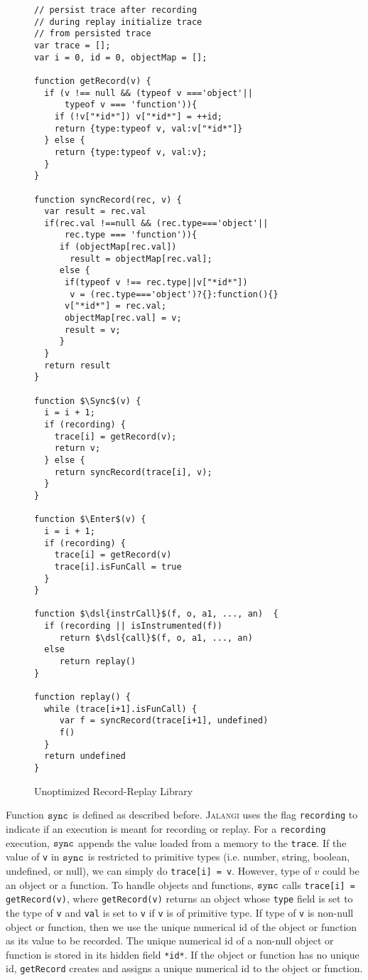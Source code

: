 \documentclass{sig-alternate}
\def\jalangi{\textsc{Jalangi}}
\newcommand \dsl [1] {\ensuremath{{\tt #1}}\xspace}
\newcommand \Sync{\dsl{sync}}
\newcommand \Enter{\dsl{enter}}
\begin{document}
\lstset{language=JavaScript}
\begin{figure}
 {\scriptsize 
\begin{lstlisting}[mathescape]
// persist trace after recording
// during replay initialize trace 
// from persisted trace 
var trace = []; 
var i = 0, id = 0, objectMap = [];

function getRecord(v) {
  if (v !== null && (typeof v ==='object'||  
      typeof v === 'function')){
    if (!v["*id*"]) v["*id*"] = ++id;
    return {type:typeof v, val:v["*id*"]}
  } else {
    return {type:typeof v, val:v};
  }
}

function syncRecord(rec, v) {
  var result = rec.val
  if(rec.val !==null && (rec.type==='object'|| 
      rec.type === 'function')){
     if (objectMap[rec.val])
       result = objectMap[rec.val];
     else {
      if(typeof v !== rec.type||v["*id*"]) 
       v = (rec.type==='object')?{}:function(){}
      v["*id*"] = rec.val;
      objectMap[rec.val] = v;
      result = v;
     }
  }
  return result
}

function $\Sync$(v) {
  i = i + 1;
  if (recording) {
    trace[i] = getRecord(v);
    return v;
  } else {
    return syncRecord(trace[i], v);
  }
}

function $\Enter$(v) {
  i = i + 1;
  if (recording) {
    trace[i] = getRecord(v)
    trace[i].isFunCall = true
  }
}

function $\dsl{instrCall}$(f, o, a1, ..., an)  {
  if (recording || isInstrumented(f)) 
     return $\dsl{call}$(f, o, a1, ..., an)
  else
     return replay()
}

function replay() {
  while (trace[i+1].isFunCall) {
     var f = syncRecord(trace[i+1], undefined)
     f()
  }
  return undefined
}
\end{lstlisting}
}
  \caption{Unoptimized Record-Replay Library}
  \label{fig:lib1}
\end{figure}

Function $\Sync$ is defined as described before.  \jalangi{} uses the
flag \texttt{recording} to indicate if an execution is meant for
recording or replay.  For a \texttt{recording} execution, $\Sync$
appends the value loaded from a memory to the \texttt{trace}.  If the
value of \texttt{v} in $\Sync$ is restricted to primitive types
(i.e. number, string, boolean, undefined, or null), we can simply do
\texttt{trace[i] = v}.  However, type of $v$ could be an object or a
function.  To handle objects and functions, $\Sync$ calls
\texttt{trace[i] = getRecord(v)}, where \texttt{getRecord(v)} returns
an object whose \texttt{type} field is set to the type of \texttt{v}
and \texttt{val} is set to \texttt{v} if \texttt{v} is of primitive
type.  If type of \texttt{v} is non-null object or function, then we
use the unique numerical id of the object or function as its value to
be recorded.  The unique numerical id of a non-null object or function
is stored in its hidden field \texttt{*id*}.  If the object or
function has no unique id, \texttt{getRecord} creates and assigns a
unique numerical id to the object or function.
\end{document}
